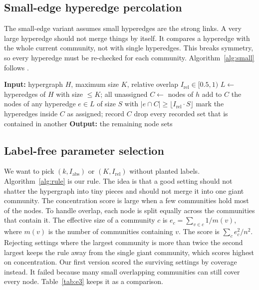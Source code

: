 \documentclass[11pt,a4paper]{article}
\newcommand{\Iabs}{I_{\mathrm{abs}}}
\newcommand{\Irel}{I_{\mathrm{rel}}}
\begin{document}
\subsection{Small-edge hyperedge percolation}
The small-edge variant assumes small hyperedges are the strong links. A very large hyperedge should not merge things by itself. It compares a hyperedge with the whole current community, not with single hyperedges. This breaks symmetry, so every hyperedge must be re-checked for each community. Algorithm~\ref{alg:small} follows \cite{kovacs2025}.

\begin{algorithm}[t]
\caption{Small-edge hyperedge percolation}\label{alg:small}
\begin{algorithmic}[1]
\STATE \textbf{Input:} hypergraph $H$, maximum size $K$, relative overlap $\Irel \in [0.5,1)$
\STATE $L \leftarrow$ hyperedges of $H$ with size $\le K$; all unassigned
  \STATE $C \leftarrow$ nodes of $h$
  \REPEAT
    \STATE add to $C$ the nodes of any hyperedge $e \in L$ of size $S$ with $|e \cap C| \ge \lfloor \Irel \cdot S \rfloor$
  \STATE mark the hyperedges inside $C$ as assigned; record $C$
\ENDFOR
\STATE drop every recorded set that is contained in another
\STATE \textbf{Output:} the remaining node sets
\end{algorithmic}
\end{algorithm}

\subsection{Label-free parameter selection}
We want to pick $(k,\Iabs)$ or $(K,\Irel)$ without planted labels. Algorithm~\ref{alg:rule} is our rule. The idea is that a good setting should not shatter the hypergraph into tiny pieces and should not merge it into one giant community. The concentration score is large when a few communities hold most of the nodes. To handle overlap, each node is split equally across the communities that contain it. The effective size of a community $c$ is $e_c = \sum_{v \in c} 1/m(v)$, where $m(v)$ is the number of communities containing $v$. The score is $\sum_c e_c^2/n^2$. Rejecting settings where the largest community is more than twice the second largest keeps the rule away from the single giant community, which scores highest on concentration. Our first version scored the surviving settings by coverage instead. It failed because many small overlapping communities can still cover every node. Table~\ref{tab:e3} keeps it as a comparison.
\end{document}
